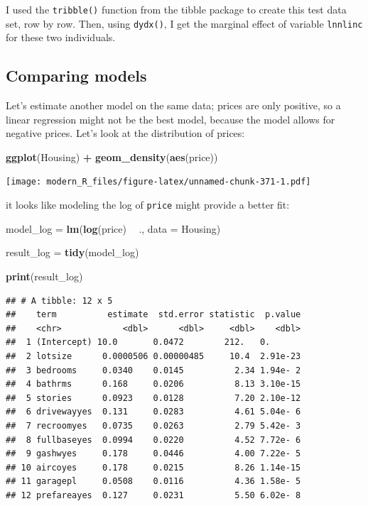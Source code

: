 \documentclass[]{gitbook}
\newenvironment{Shaded}{\begin{snugshade}}{\end{snugshade}}
\newcommand{\DataTypeTok}[1]{\textcolor[rgb]{0.13,0.29,0.53}{#1}}
\newcommand{\KeywordTok}[1]{\textcolor[rgb]{0.13,0.29,0.53}{\textbf{#1}}}
\newcommand{\NormalTok}[1]{#1}
\newcommand{\OperatorTok}[1]{\textcolor[rgb]{0.81,0.36,0.00}{\textbf{#1}}}
\newcommand{\StringTok}[1]{\textcolor[rgb]{0.31,0.60,0.02}{#1}}
\theoremstyle{definition}
\theoremstyle{definition}
\theoremstyle{definition}
\theoremstyle{remark}
\begin{document}
I used the \texttt{tribble()} function from the tibble package to create
this test data set, row by row. Then, using \texttt{dydx()}, I get the
marginal effect of variable \texttt{lnnlinc} for these two individuals.

\hypertarget{comparing-models}{%
\subsection{Comparing models}\label{comparing-models}}

Let's estimate another model on the same data; prices are only positive,
so a linear regression might not be the best model, because the model
allows for negative prices. Let's look at the distribution of prices:

\begin{Shaded}
\begin{Highlighting}[]
\KeywordTok{ggplot}\NormalTok{(Housing) }\OperatorTok{+}
\StringTok{  }\KeywordTok{geom_density}\NormalTok{(}\KeywordTok{aes}\NormalTok{(price))}
\end{Highlighting}
\end{Shaded}

\texttt{[image: modern\_R\_files/figure-latex/unnamed-chunk-371-1.pdf]}

it looks like modeling the log of \texttt{price} might provide a better
fit:

\begin{Shaded}
\begin{Highlighting}[]
\NormalTok{model_log =}\StringTok{ }\KeywordTok{lm}\NormalTok{(}\KeywordTok{log}\NormalTok{(price) }\OperatorTok{~}\StringTok{ }\NormalTok{., }\DataTypeTok{data =}\NormalTok{ Housing)}

\NormalTok{result_log =}\StringTok{ }\KeywordTok{tidy}\NormalTok{(model_log)}

\KeywordTok{print}\NormalTok{(result_log)}
\end{Highlighting}
\end{Shaded}

\begin{verbatim}
## # A tibble: 12 x 5
##    term          estimate  std.error statistic  p.value
##    <chr>            <dbl>      <dbl>     <dbl>    <dbl>
##  1 (Intercept) 10.0       0.0472        212.   0.      
##  2 lotsize      0.0000506 0.00000485     10.4  2.91e-23
##  3 bedrooms     0.0340    0.0145          2.34 1.94e- 2
##  4 bathrms      0.168     0.0206          8.13 3.10e-15
##  5 stories      0.0923    0.0128          7.20 2.10e-12
##  6 drivewayyes  0.131     0.0283          4.61 5.04e- 6
##  7 recroomyes   0.0735    0.0263          2.79 5.42e- 3
##  8 fullbaseyes  0.0994    0.0220          4.52 7.72e- 6
##  9 gashwyes     0.178     0.0446          4.00 7.22e- 5
## 10 aircoyes     0.178     0.0215          8.26 1.14e-15
## 11 garagepl     0.0508    0.0116          4.36 1.58e- 5
## 12 prefareayes  0.127     0.0231          5.50 6.02e- 8
\end{verbatim}
\end{document}
